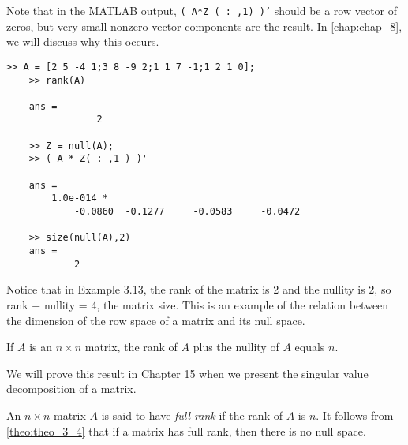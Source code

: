 \documentclass[../main.tex]{subfiles}
\begin{document}
\begin{example} \label{exm:exm_3_13} Note that in the MATLAB output, \texttt{( A*Z ( : ,1) )'} should be a row vector of zeros, but very small nonzero
vector components are the result. In \autoref{chap:chap_8}, we will discuss why this occurs.
\begin{lstlisting}[numbers=none,frame=none]
	>> A = [2 5 -4 1;3 8 -9 2;1 1 7 -1;1 2 1 0];
	>> rank(A)

	ans =
				2

	>> Z = null(A);
	>> ( A * Z( : ,1 ) )'

	ans =
		1.0e-014 *
			-0.0860	 -0.1277	 -0.0583	 -0.0472

	>> size(null(A),2)
	ans =
			2
\end{lstlisting}
\end{example}

Notice that in Example 3.13, the rank of the matrix is 2 and the nullity is 2, so rank + nullity = 4, the matrix size. This is an example of the relation between the dimension of the row space of a matrix and its null space.

\begin{theorem}
	\label{theo:theo_3_4}
	If $A$ is an $n \times n$ matrix, the rank of $A$ plus the nullity of $A$ equals $n$.
\end{theorem}
We will prove this result in Chapter 15 when we present the singular value decomposition of a matrix.

\begin{remark}
	An $n \times n$ matrix $A$ is said to have \emph{full rank} if the rank of $A$ is $n$. It follows from \autoref{theo:theo_3_4} that if a matrix has full rank, then there is no null space.
\end{remark}
\end{document}
